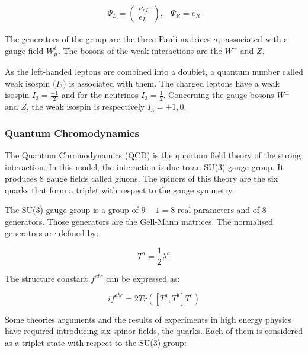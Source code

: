     \begin{equation}
      \begin{array}{cc}
        \Psi_L = 
         \begin{pmatrix}
           \nu_{eL} \\
           e_L
         \end{pmatrix}, & \Psi_R = e_R
      \end{array}
    \end{equation}

    The generators of the group are the three Pauli matrices $\sigma_i$, associated with a gauge field $W_{\mu}^i$.
    The bosons of the weak interactions are the $W^{\pm}$ and $Z$.

    As the left-handed leptons are combined into a doublet, a quantum number called weak isospin ($I_3$) is associated with them.
    The charged leptons have a weak isospin $I_3 = \frac{-1}{2}$ and for the neutrinos $I_3 = \frac{1}{2}$.
    Concerning the gauge bosons $W^{\pm}$ and $Z$, the weak isospin is respectively $I_3 = \pm 1, 0$.
    
    \subsubsection{Quantum Chromodynamics}
    
    The Quantum Chromodynamics (QCD) is the quantum field theory of the strong interaction.
    In this model, the interaction is due to an SU(3) gauge group. 
    It produces 8 gauge fields called gluons.
    The spinors of this theory are the six quarks that form a triplet with respect to the gauge symmetry.

    The SU(3) gauge group is a group of $9 - 1 = 8$ real parameters and of 8 generators. 
    Those generators are the Gell-Mann matrices. 
    The normalised generators are defined by: 
    
    \begin{equation}
        T^a = \frac{1}{2}\lambda^a
    \end{equation}

    The structure constant $f^{abc}$ can be expressed as:

    \begin{equation}
        if^{abc} = 2 Tr([T^a,T^b]T^c)
    \end{equation}
     
    Some theories arguments and the results of experiments in high energy physics have required introducing six spinor fields, the quarks.
    Each of them is considered as a triplet state with respect to the SU(3) group:

